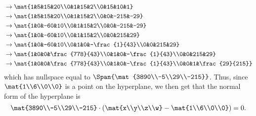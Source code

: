 \begin{exercises}
\begin{problist}
\begin{solution}
\begin{enumerate}
\begin{align*}
					&\rightarrow \mat{1&5&15&20\\0&1&15&2\\0&15&10&1}\\
					&\rightarrow \mat{1&5&15&20\\0&1&15&2\\0&0&-215&-29}\\
					&\rightarrow \mat{1&0&-60&10\\0&1&15&2\\0&0&-215&-29}\\
					&\rightarrow \mat{1&0&-60&10\\0&1&15&2\\0&0&215&29}\\
					&\rightarrow \mat{1&0&-60&10\\0&1&0&-\frac{1}{43}\\0&0&215&29}\\
					&\rightarrow \mat{1&0&0&\frac{778}{43}\\0&1&0&-\frac{1}{43}\\0&0&215&29}\\
					&\rightarrow \mat{1&0&0&\frac{778}{43}\\0&1&0&-\frac{1}{43}\\0&0&1&\frac{29}{215}}
				\end{align*}
				which has nullspace equal to $\Span{\mat{3890\\-5\\29\\-215}}$. Thus, since $\mat{1\\6\\0\\0}$ is a point on the hyperplane, 
				we then get that the normal form of the hyperplane is \[\mat{3890\\-5\\29\\-215}\cdot\left(\mat{x\\y\\z\\w}-\mat{1\\6\\0\\0} \right)=0.\]

			\end{enumerate}
		\end{solution}	


\end{problist}
\end{exercises}
